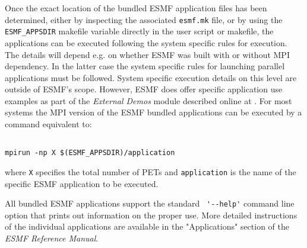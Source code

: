 Once the exact location of the bundled ESMF application files has been determined, either by inspecting the associated {\tt esmf.mk} file, or by using the {\tt ESMF\_APPSDIR} makefile variable directly in the user script or makefile, the applications can be executed following the system specific rules for execution. The details will depend e.g. on whether ESMF was built with or without MPI dependency. In the latter case the system specific rules for launching parallel applications must be followed. System specific execution details on this level are outside of ESMF's scope. However, ESMF does offer specific  application use examples as part of the {\it External Demos} module described online at . For most systems the MPI version of the ESMF bundled applications can be executed by a command equivalent to:

\begin{verbatim}

mpirun -np X $(ESMF_APPSDIR)/application

\end{verbatim}
 
where {\tt X} specifies the total number of PETs and {\tt application} is the name of the specific ESMF application to be executed.
 
All bundled ESMF applications support the standard \verb+ '--help'+ command line option that prints out information on the proper use. More detailed instructions of the individual applications are available in the "Applications" section of the {\it ESMF Reference Manual}.
